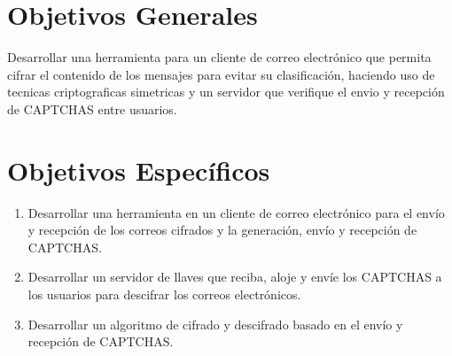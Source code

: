 \documentclass[12pt,oneside,onecolumn,openany]{report}
\begin{document}
    \section{Objetivos Generales} %
    \label{sec:objetivos_generales}
      Desarrollar  una  herramienta  para  un  cliente  de  correo  electrónico  que  permita  cifrar  el 
      contenido  de  los  mensajes  para  evitar  su  clasificación, haciendo uso de tecnicas criptograficas simetricas y un servidor que verifique el envio y recepción de CAPTCHAS entre usuarios. 
    \section{Objetivos Específicos} %
    \label{sec:objetivos_especificos}
        \begin{enumerate}
         \item Desarrollar  una  herramienta  en  un  cliente  de  correo  electrónico  para  el  envío  y recepción  de   los   correos  cifrados   y   la  generación,  envío  y  recepción  de CAPTCHAS. 
         \item Desarrollar un servidor de llaves que reciba, aloje y envíe los CAPTCHAS a los usuarios para descifrar los correos electrónicos.       
         \item Desarrollar un algoritmo de cifrado y descifrado basado en el envío y recepción de CAPTCHAS.
        \end{enumerate}
        
\end{document}
